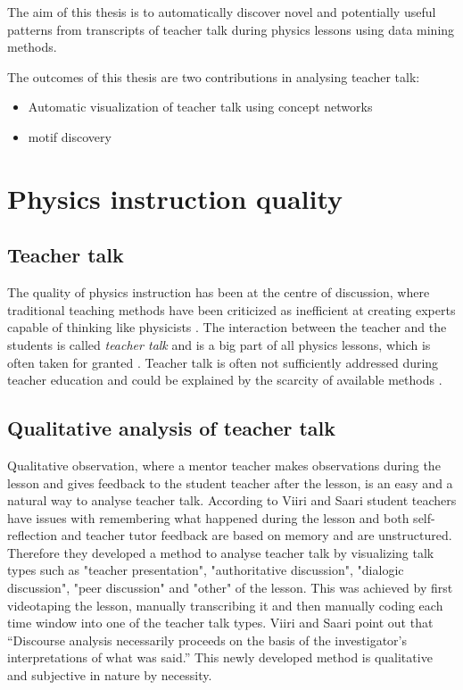 \documentclass[utf8,english]{gradu3}
\begin{document}
The aim of this thesis is to automatically discover novel and potentially useful patterns from transcripts of teacher talk during physics lessons using data mining methods. 

The outcomes of this thesis are two contributions in analysing teacher talk:

\begin{itemize}
  \item Automatic visualization of teacher talk using concept networks
  \item  motif discovery
\end{itemize}



\chapter{Physics instruction quality}
\label{chap:quip}


\section{Teacher talk}
The quality of physics instruction has been at the centre of discussion, where traditional teaching methods have been criticized as inefficient at creating experts capable of thinking like physicists \parencite{wiemanTransformingPhysicsEducation2007}. The interaction between the teacher and the students is called \emph{teacher talk} and is a big part of all physics lessons, which is often taken for granted \parencite{scottTeachingScienceMeaningful2007}. Teacher talk is often not sufficiently addressed during teacher education and could be explained by the scarcity of available methods \parencite{lehesvuoriDialogicTeachingScience2013,viiriTeacherTalkPatterns2006, crespoPraisingCorrectingProspective2002}.

\section{Qualitative analysis of teacher talk}
Qualitative observation, where a mentor teacher makes observations during the lesson and gives feedback to the student teacher after the lesson, is an easy and a natural way to analyse teacher talk. According to Viiri and Saari \parencite*{viiriTeacherTalkPatterns2006} student teachers have issues with remembering what happened during the lesson and both self-reflection and teacher tutor feedback are based on memory and are unstructured. Therefore they developed a method to analyse teacher talk by visualizing talk types such as "teacher presentation", "authoritative discussion", "dialogic discussion", "peer discussion" and "other" of the lesson. This was achieved by first videotaping the lesson, manually transcribing it and then manually coding each time window into one of the teacher talk types. Viiri and Saari \parencite*{viiriTeacherTalkPatterns2006} point out that \enquote{Discourse analysis necessarily proceeds on the basis of the investigator’s interpretations of what was said.} This newly developed method is qualitative and subjective in nature by necessity.
\end{document}
